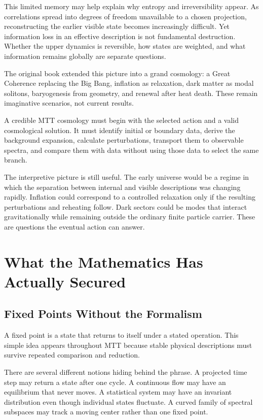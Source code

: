 \documentclass[11pt,openany]{book}
\begin{document}
This limited memory may help explain why entropy and irreversibility appear.
As correlations spread into degrees of freedom unavailable to a chosen
projection, reconstructing the earlier visible state becomes increasingly
difficult. Yet information loss in an effective description is not
fundamental destruction. Whether the upper dynamics is reversible, how states
are weighted, and what information remains globally are separate questions.

The original book extended this picture into a grand cosmology: a Great
Coherence replacing the Big Bang, inflation as relaxation, dark matter as
modal solitons, baryogenesis from geometry, and renewal after heat death.
These remain imaginative scenarios, not current results.

A credible MTT cosmology must begin with the selected action and a valid
cosmological solution. It must identify initial or boundary data, derive the
background expansion, calculate perturbations, transport them to observable
spectra, and compare them with data without using those data to select the
same branch.

The interpretive picture is still useful. The early universe would be a
regime in which the separation between internal and visible descriptions was
changing rapidly. Inflation could correspond to a controlled relaxation only
if the resulting perturbations and reheating follow. Dark sectors could be
modes that interact gravitationally while remaining outside the ordinary
finite particle carrier. These are questions the eventual action can answer.

\part{What the Mathematics Has Actually Secured}

\chapter{Fixed Points Without the Formalism}

A fixed point is a state that returns to itself under a stated operation.
This simple idea appears throughout MTT because stable physical descriptions
must survive repeated comparison and reduction.

There are several different notions hiding behind the phrase. A projected
time step may return a state after one cycle. A continuous flow may have an
equilibrium that never moves. A statistical system may have an invariant
distribution even though individual states fluctuate. A curved family of
spectral subspaces may track a moving center rather than one fixed point.
\end{document}
